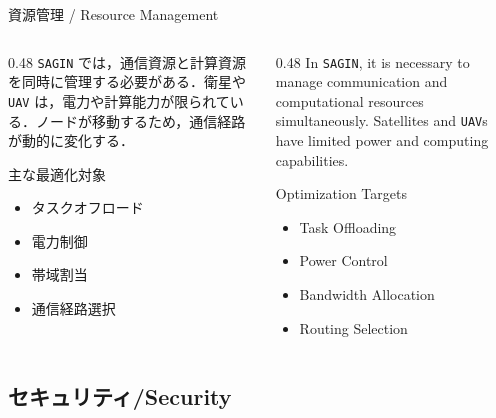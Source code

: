 \documentclass[11pt, aspectratio=169]{beamer}
\begin{document}
\begin{frame}[c]{資源管理 / Resource Management}
  \begin{columns}[t]
    \begin{column}{0.48\textwidth}
      \texttt{SAGIN} では，通信資源と計算資源を同時に管理する必要がある．衛星や \texttt{UAV} は，電力や計算能力が限られている．ノードが移動するため，通信経路が動的に変化する．

      \vspace{1em}
      主な最適化対象
      \begin{itemize}
        \item タスクオフロード
        \item 電力制御
        \item 帯域割当
        \item 通信経路選択
      \end{itemize}
    \end{column}

    \hfill
    \vrule
    \hfill

    \begin{column}{0.48\textwidth}
      In \texttt{SAGIN}, it is necessary to manage communication and computational resources simultaneously. Satellites and \texttt{UAV}s have limited power and computing capabilities.

      \vspace{1em}
      Optimization Targets
      \begin{itemize}
        \item Task Offloading
        \item Power Control
        \item Bandwidth Allocation
        \item Routing Selection
      \end{itemize}
    \end{column}
  \end{columns}
\end{frame}

\subsection{セキュリティ/Security}
\end{document}
